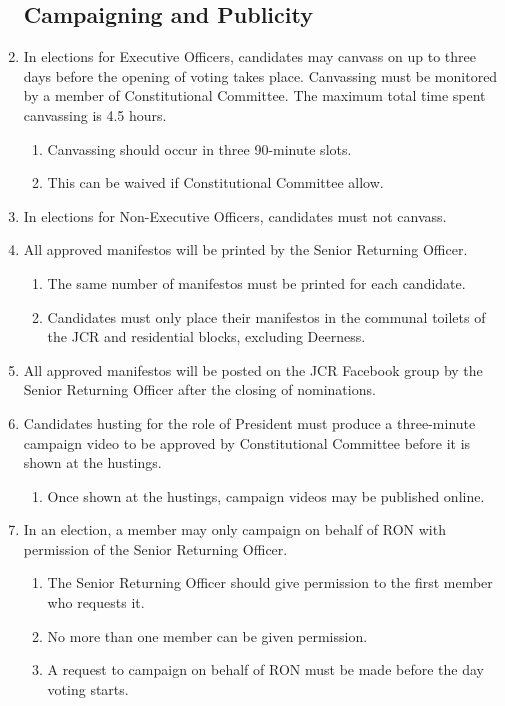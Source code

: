 \documentclass[12pt]{article}  %
\begin{document}
\begin{enumerate}
	\subsection{Campaigning and Publicity}
	\item In elections for Executive Officers, candidates may canvass on up to three days before the opening of voting takes place. Canvassing must be monitored by a member of Constitutional Committee. The maximum total time spent canvassing is 4.5 hours.
	\begin{enumerate}
		\item Canvassing should occur in three 90-minute slots.
		\item This can be waived if Constitutional Committee allow.
	\end{enumerate}
	\item In elections for Non-Executive Officers, candidates must not canvass.
	\item All approved manifestos will be printed by the Senior Returning Officer.
	\begin{enumerate}
		\item The same number of manifestos must be printed for each candidate.
		\item Candidates must only place their manifestos in the communal toilets of the JCR and residential blocks, excluding Deerness.
	\end{enumerate}
	\item All approved manifestos will be posted on the JCR Facebook group by the Senior Returning Officer after the closing of nominations.
	\item Candidates husting for the role of President must produce a three-minute campaign video to be approved by Constitutional Committee before it is shown at the hustings.
	\begin{enumerate}
		\item Once shown at the hustings, campaign videos may be published online.
	\end{enumerate}
	\item In an election, a member may only campaign on behalf of RON with permission of the Senior Returning Officer.
	\begin{enumerate}
		\item The Senior Returning Officer should give permission to the first member who requests it.
		\item No more than one member can be given permission.
		\item A request to campaign on behalf of RON must be made before the day voting starts.

\end{enumerate}
\end{enumerate}
\end{document}
